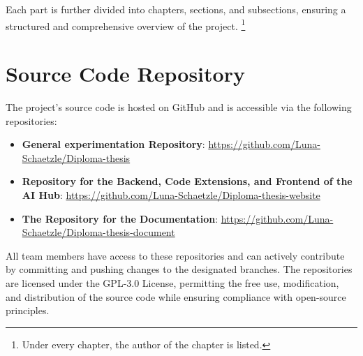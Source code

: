 Each part is further divided into chapters, sections, and subsections, ensuring a structured and comprehensive overview of the project.
\footnote{Under every chapter, the author of the chapter is listed.}


\section{Source Code Repository}

The project's source code is hosted on GitHub and is accessible via the following repositories:

\begin{itemize}
    \item \textbf{General experimentation Repository}: \url{https://github.com/Luna-Schaetzle/Diploma-thesis}
    \item \textbf{Repository for the Backend, Code Extensions, and Frontend of the AI Hub}: \url{https://github.com/Luna-Schaetzle/Diploma-thesis-website}
    \item \textbf{The Repository for the Documentation}: \url{https://github.com/Luna-Schaetzle/Diploma-thesis-document}
\end{itemize}

All team members have access to these repositories and can actively contribute by committing and pushing changes to the designated branches. The repositories are licensed under the GPL-3.0 License, permitting the free use, modification, and distribution of the source code while ensuring compliance with open-source principles.